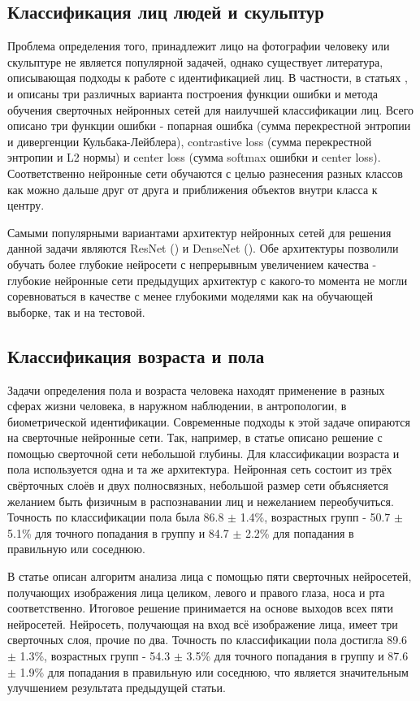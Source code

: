 \documentclass[a4paper,14pt]{extarticle}
\begin{document}
    \subsection{Классификация лиц людей и скульптур}
    Проблема определения того, принадлежит лицо на фотографии человеку или скульптуре не является популярной задачей, однако существует литература, описывающая подходы к работе с идентификацией лиц. В частности, в статьях \cite{pfid}, \cite{pfid2} и \cite{pfid3} описаны три различных варианта построения функции ошибки и метода обучения сверточных нейронных сетей для наилучшей классификации лиц. Всего описано три функции ошибки - попарная ошибка (сумма перекрестной энтропии и дивергенции Кульбака-Лейблера), contrastive loss (сумма перекрестной энтропии и L2 нормы) и center loss (сумма softmax ошибки и center loss). Соответственно нейронные сети обучаются с целью разнесения разных классов как можно дальше друг от друга и приближения объектов внутри класса к центру.
    \par Самыми популярными вариантами архитектур нейронных сетей для решения данной задачи являются ResNet (\cite{resnet}) и DenseNet (\cite{densenet}). Обе архитектуры позволили обучать более глубокие нейросети с непрерывным увеличением качества - глубокие нейронные сети предыдущих архитектур с какого-то момента не могли соревноваться в качестве с менее глубокими моделями как на обучающей выборке, так и на тестовой.

    \subsection{Классификация возраста и пола}
    \par Задачи определения пола и возраста человека находят применение в разных сферах жизни человека, в наружном наблюдении, в антропологии, в биометрической идентификации. Современные подходы к этой задаче опираются на сверточные нейронные сети. Так, например, в статье \cite{hassner} описано решение с помощью сверточной сети небольшой глубины. Для классификации возраста и пола используется одна и та же архитектура. Нейронная сеть состоит из трёх свёрточных слоёв и двух полносвязных, небольшой размер сети объясняется желанием быть физичным в распознавании лиц и нежеланием переобучиться. Точность по классификации пола была 86.8 $\pm$ 1.4\%, возрастных групп - 50.7 $\pm$ 5.1\% для точного попадания в группу и 84.7 $\pm$ 2.2\% для попадания в правильную или соседнюю.
    \par В статье \cite{INDIA} описан алгоритм анализа лица с помощью пяти сверточных нейросетей, получающих изображения лица целиком, левого и правого глаза, носа и рта соответственно. Итоговое решение принимается на основе выходов всех пяти нейросетей. Нейросеть, получающая на вход всё изображение лица, имеет три сверточных слоя, прочие по два. Точность по классификации пола достигла 89.6 $\pm$ 1.3\%, возрастных групп - 54.3 $\pm$ 3.5\% для точного попадания в группу и 87.6 $\pm$ 1.9\% для попадания в правильную или соседнюю, что является значительным улучшением результата предыдущей статьи.
    \newpage
\end{document}
